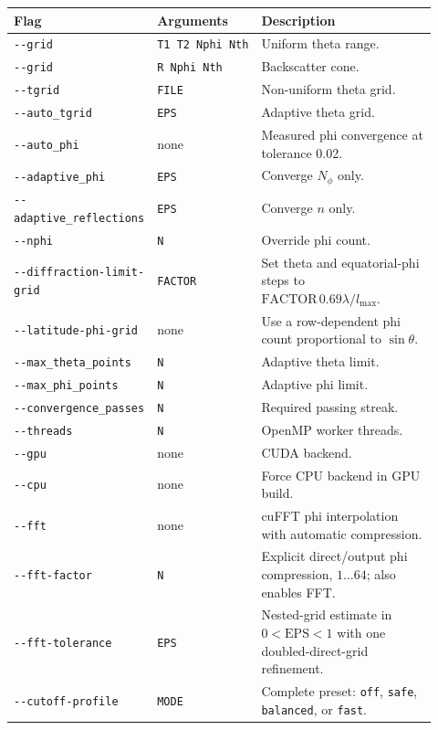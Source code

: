 \documentclass[
  10pt,
  a4paper,
]{article}
\begin{document}
\begin{longtable}[]{@{}L{0.24\linewidth}L{0.22\linewidth}L{0.46\linewidth}@{}}
\toprule\noalign{}
Flag & Arguments & Description \\
\midrule\noalign{}
\endhead
\bottomrule\noalign{}
\endlastfoot
\texttt{-\/-grid} & \texttt{T1\ T2\ Nphi\ Nth} & Uniform theta range. \\
\texttt{-\/-grid} & \texttt{R\ Nphi\ Nth} & Backscatter cone. \\
\texttt{-\/-tgrid} & \texttt{FILE} & Non-uniform theta grid. \\
\texttt{-\/-auto\_tgrid} & \texttt{EPS} & Adaptive theta grid. \\
\texttt{-\/-auto\_phi} & none & Measured phi convergence at tolerance
0.02. \\
\texttt{-\/-adaptive\_phi} & \texttt{EPS} & Converge \(N_\phi\) only. \\
\texttt{-\/-adaptive\_reflections} & \texttt{EPS} & Converge \(n\) only. \\
\texttt{-\/-nphi} & \texttt{N} & Override phi count. \\
\texttt{-\/-diffraction-limit-grid} & \texttt{FACTOR} & Set theta and
equatorial-phi steps to $\mathrm{FACTOR}\,0.69\lambda/l_{\max}$. \\
\texttt{-\/-latitude-phi-grid} & none & Use a row-dependent phi count
proportional to $\sin\theta$. \\
\texttt{-\/-max\_theta\_points} & \texttt{N} & Adaptive theta limit. \\
\texttt{-\/-max\_phi\_points} & \texttt{N} & Adaptive phi limit. \\
\texttt{-\/-convergence\_passes} & \texttt{N} & Required passing streak. \\
\texttt{-\/-threads} & \texttt{N} & OpenMP worker threads. \\
\texttt{-\/-gpu} & none & CUDA backend. \\
\texttt{-\/-cpu} & none & Force CPU backend in GPU build. \\
\texttt{-\/-fft} & none & cuFFT phi interpolation with automatic
compression. \\
\texttt{-\/-fft-factor} & \texttt{N} & Explicit direct/output phi
compression, $1\ldots64$; also enables FFT. \\
\texttt{-\/-fft-tolerance} & \texttt{EPS} & Nested-grid estimate in
$0<\mathrm{EPS}<1$ with one doubled-direct-grid refinement. \\
\texttt{-\/-cutoff-profile} & \texttt{MODE} & Complete preset:
\texttt{off}, \texttt{safe}, \texttt{balanced}, or \texttt{fast}. \\

\end{longtable}
\end{document}
